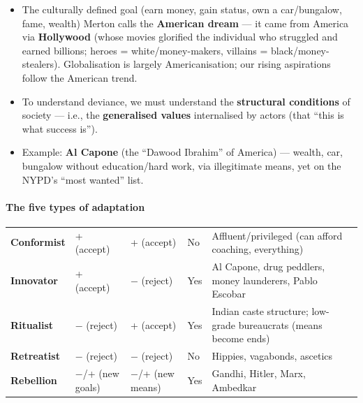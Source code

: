 \begin{KeyConcept}
\begin{itemize}
\item The culturally defined goal (earn money, gain status, own a car/bungalow, fame, wealth) Merton calls the \textbf{American dream} --- it came from America via \textbf{Hollywood} (whose movies glorified the individual who struggled and earned billions; heroes = white/money-makers, villains = black/money-stealers). Globalisation is largely Americanisation; our rising aspirations follow the American trend.
\end{itemize}
\end{KeyConcept}

\begin{DataFact}
\begin{itemize}
\item To understand deviance, we must understand the \textbf{structural conditions} of society --- i.e., the \textbf{generalised values} internalised by actors (that ``this is what success is'').
\item Example: \textbf{Al Capone} (the ``Dawood Ibrahim'' of America) --- wealth, car, bungalow without education/hard work, via illegitimate means, yet on the NYPD's ``most wanted'' list.
\end{itemize}
\end{DataFact}

\paragraph{The five types of adaptation}

\begin{center}
\begin{tabularx}{\textwidth}{p{2.6cm} p{2.6cm} p{2.6cm} p{1.8cm} Y}
 &  &  &  &  \\
\midrule
\textbf{Conformist} & + (accept) & + (accept) & No & Affluent/privileged (can afford coaching, everything) \\
\textbf{Innovator} & + (accept) & $-$ (reject) & Yes & Al Capone, drug peddlers, money launderers, Pablo Escobar \\
\textbf{Ritualist} & $-$ (reject) & + (accept) & Yes & Indian caste structure; low-grade bureaucrats (means become ends) \\
\textbf{Retreatist} & $-$ (reject) & $-$ (reject) & No & Hippies, vagabonds, ascetics \\
\textbf{Rebellion} & $-$/+ (new goals) & $-$/+ (new means) & Yes & Gandhi, Hitler, Marx, Ambedkar \\
\bottomrule
\end{tabularx}
\end{center}

